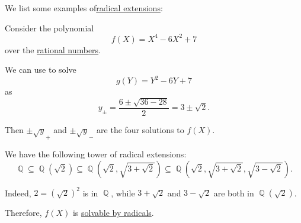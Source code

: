 \begin{example}\label{ex:def:radical_extension}
  We list some examples of\hyperref[def:radical_extension]{radical extensions}:
  \begin{thmenum}
     Consider the polynomial
    \begin{equation*}
      f(X) = X^4 - 6X^2 + 7
    \end{equation*}
    over the \hyperref[def:rational_numbers]{rational numbers}.

    We can use  to solve
    \begin{equation*}
      g(Y) = Y^2 - 6Y + 7
    \end{equation*}
    as
    \begin{equation*}
      y_\pm = \frac {6 \pm \sqrt{ 36 - 28 }} 2 = 3 \pm \sqrt 2.
    \end{equation*}

    Then \( \pm \sqrt y_+ \) and \( \pm \sqrt y_- \) are the four solutions to \( f(X) \).

    We have the following tower of radical extensions:
    \begin{equation*}
      \BbbQ \subseteq \BbbQ(\sqrt 2) \subseteq \BbbQ(\sqrt 2, \sqrt{3 + \sqrt 2}) \subseteq \BbbQ(\sqrt 2, \sqrt{3 + \sqrt 2}, \sqrt{3 - \sqrt 2}).
    \end{equation*}

    Indeed, \( 2 = (\sqrt 2)^2 \) is in \( \BbbQ \), while \( 3 + \sqrt 2 \) and \( 3 - \sqrt 2 \) are both in \( \BbbQ(\sqrt 2) \).

    Therefore, \( f(X) \) is \hyperref[def:polynomial_solvable_by_radicals]{solvable by radicals}.
  \end{thmenum}
\end{example}

